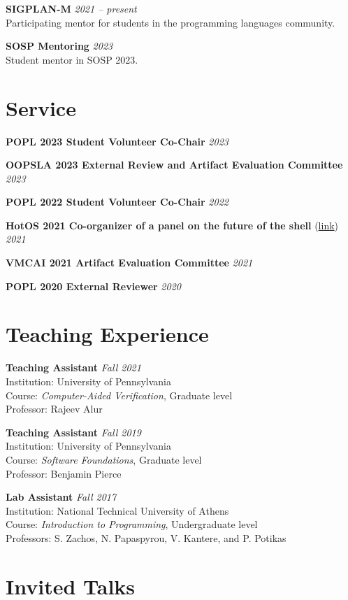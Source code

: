 \documentclass[margin]{res}
\begin{document}
\begin{resume}
\textbf{SIGPLAN-M}  \hfill {\em 2021 -- present} \\
Participating mentor for students in the programming languages community.

\textbf{SOSP Mentoring}  \hfill {\em 2023} \\
Student mentor in SOSP 2023.

\section{Service}

\textbf{POPL 2023 Student Volunteer Co-Chair}  \hfill {\em 2023}

\textbf{OOPSLA 2023 External Review and Artifact Evaluation Committee}  \hfill {\em 2023}

\textbf{POPL 2022 Student Volunteer Co-Chair}  \hfill {\em 2022}

\textbf{HotOS 2021 Co-organizer of a panel on the future of the shell} (\href{https://fut-shell.github.io/}{link})  \hfill {\em 2021}

\textbf{VMCAI 2021 Artifact Evaluation Committee}  \hfill {\em 2021}

\textbf{POPL 2020 External Reviewer}  \hfill {\em 2020}

\section{Teaching Experience}

\textbf{Teaching Assistant}  \hfill {\em Fall 2021} \\
Institution: University of Pennsylvania \\
Course: \textit{Computer-Aided Verification}, Graduate level \\
Professor: Rajeev Alur

\textbf{Teaching Assistant}  \hfill {\em Fall 2019} \\
Institution: University of Pennsylvania \\
Course: \textit{Software Foundations}, Graduate level \\
Professor: Benjamin Pierce

\textbf{Lab Assistant}  \hfill {\em Fall 2017} \\
Institution: National Technical University of Athens \\
Course: \textit{Introduction to Programming}, Undergraduate level \\
Professors: S. Zachos, N. Papaspyrou, V. Kantere, and P. Potikas


\section{Invited Talks}








\end{resume}
\end{document}
